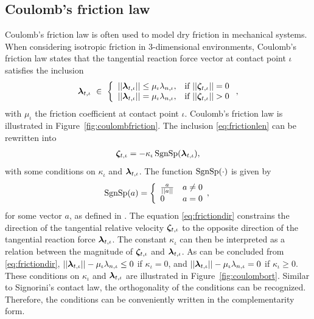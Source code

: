 \documentclass[../DC2017114Bouma.tex]{subfiles}
\begin{document}
\subsection{Coulomb's friction law}\label{sec:2fric}
Coulomb's friction law is often used to model dry friction in mechanical systems. When considering isotropic friction in 3-dimensional environments, Coulomb's friction law states that the tangential reaction force vector at contact point $\iota$ satisfies the inclusion
\begin{align}
\lambdab_{t,\iota}\ \in\ \left\{ \begin{array}{ll}
||\lambdab_{t,\iota}||\leq\mu_{\iota}\lambda_{n,\iota}, &\text{if }||\zetab_{t,\iota}||=0\\
||\lambdab_{t,\iota}|| = \mu_{\iota}\lambda_{n,\iota}, &\text{if }||\zetab_{t,\iota}||>0
\end{array}\right.,\label{eq:frictionlen}
\end{align}
%
with $\mu_{\iota}$ the friction coefficient at contact point $\iota$. Coulomb's friction law is illustrated in Figure~\ref{fig:coulombfriction}. The inclusion \eqref{eq:frictionlen} can be rewritten into
\begin{align}
\boldsymbol{\zeta}_{t,\iota} = -\kappa_{\iota}\operatorname{\text{SgnSp}}(\boldsymbol{\lambda}_{t,\iota}),\label{eq:frictiondir}
\end{align}
%
with some conditions on $\kappa_{\iota}$ and $\boldsymbol{\lambda}_{t,\iota}$. The function $\operatorname{\text{SgnSp}}(\cdot)$ is given by 
\begin{equation}
\operatorname{\text{SgnSp}}(a) = \left\lbrace\begin{array}{ll}
\frac{a}{||a||} & a \neq 0\\
0 & a = 0
\end{array},\right.
\end{equation}
for some vector $a$, as defined in \cite{Studer2006}. The equation \eqref{eq:frictiondir} constrains the direction of the tangential relative velocity $\boldsymbol{\zeta}_{t,\iota}$ to the opposite direction of the tangential reaction force $\boldsymbol{\lambda}_{t,\iota}$. The constant $\kappa_{\iota}$ can then be interpreted as a relation between the magnitude of $\boldsymbol{\zeta}_{t,\iota}$ and $\boldsymbol{\lambda}_{t,\iota}$. As can be concluded from \eqref{eq:frictiondir}, $||\boldsymbol{\lambda}_{t,\iota}||-\mu_{\iota}\lambda_{n,\iota}\leq 0$ if $\kappa_{\iota} = 0$, and $||\boldsymbol{\lambda}_{t,\iota}||-\mu_{\iota}\lambda_{n,\iota} = 0$ if $\kappa_{\iota} \geq 0$. These conditions on $\kappa_{\iota}$ and $\boldsymbol{\lambda}_{t,\iota}$ are illustrated in Figure~\ref{fig:coulombort}. Similar to Signorini's contact law, the orthogonality of the conditions can be recognized. Therefore, the conditions can be conveniently written in the complementarity form.
\end{document}
